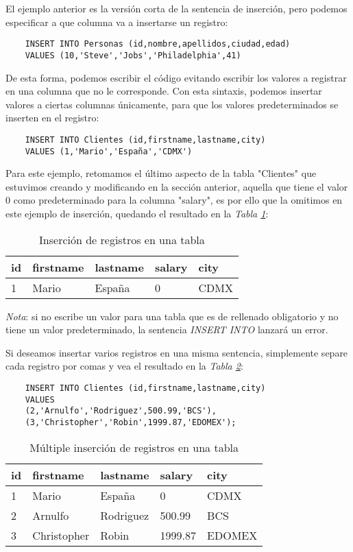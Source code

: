 El ejemplo anterior es la versión corta de la sentencia de inserción, pero podemos especificar a que columna va a insertarse un registro:
\begin{lstlisting}
    INSERT INTO Personas (id,nombre,apellidos,ciudad,edad)
    VALUES (10,'Steve','Jobs','Philadelphia',41)
\end{lstlisting}

De esta forma, podemos escribir el código evitando escribir los valores a registrar en una columna que no le corresponde. Con esta sintaxis, podemos insertar valores a ciertas columnas únicamente, para que los valores predeterminados se inserten en el registro:
\begin{lstlisting}
    INSERT INTO Clientes (id,firstname,lastname,city)
    VALUES (1,'Mario','España','CDMX')
\end{lstlisting}

Para este ejemplo, retomamos el último aspecto de la tabla "Clientes" que estuvimos creando y modificando en la sección anterior, aquella que tiene el valor 0 como predeterminado para la columna "salary", es por ello que la omitimos en este ejemplo de inserción, quedando el resultado en la \textit{Tabla \ref{tab: 22}}:
\begin{table}[H]
    \centering
    \caption{Inserción de registros en una tabla}
    \label{tab: 22}
    \begin{tabular}{|l|l|l|l|l|}
        \hline
        \textbf{id} & \textbf{firstname} & \textbf{lastname} & \textbf{salary} & \textbf{city} \\
        \hline
        1 & Mario & España & 0 & CDMX \\ 
        \hline
    \end{tabular}
\end{table}

\textit{Nota}: si no escribe un valor para una tabla que es de rellenado obligatorio y no tiene un valor predeterminado, la sentencia \textit{INSERT INTO} lanzará un error.

Si deseamos insertar varios registros en una misma sentencia, simplemente separe cada registro por comas y vea el resultado en la \textit{Tabla \ref{tab: 23}}:
\begin{lstlisting}
    INSERT INTO Clientes (id,firstname,lastname,city)
    VALUES
    (2,'Arnulfo','Rodriguez',500.99,'BCS'),
    (3,'Christopher','Robin',1999.87,'EDOMEX');
\end{lstlisting}
\begin{table}[H]
    \centering
    \caption{Múltiple inserción de registros en una tabla}
    \label{tab: 23}
    \begin{tabular}{|l|l|l|l|l|}
        \hline
        \textbf{id} & \textbf{firstname} & \textbf{lastname} & \textbf{salary} & \textbf{city} \\
        \hline
        1 & Mario       & España    & 0         & CDMX \\ 
        \hline
        2 & Arnulfo     & Rodriguez & 500.99    & BCS \\
        \hline
        3 & Christopher & Robin     & 1999.87   & EDOMEX \\
        \hline
    \end{tabular}
\end{table}


